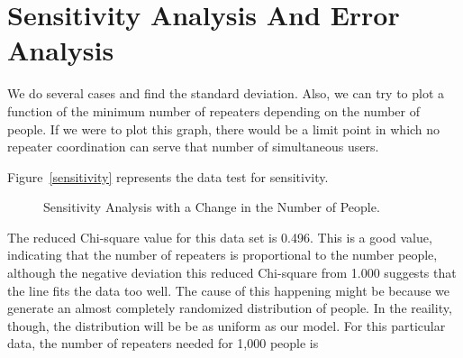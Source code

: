 \documentclass{icmmcm}
\begin{document}
\section{Sensitivity Analysis And Error Analysis}
We do several cases and find the standard deviation. Also, we can try to plot a function of the minimum number of repeaters depending on the number of people. If we were to plot this graph, there would be a limit point in which no repeater coordination can serve that number of simultaneous users.

Figure~\ref{sensitivity} represents the data test for sensitivity.
\begin{figure}[ht]
\begin{center}
\end{center}
\caption[Sensitivity of the Model]{Sensitivity Analysis with a Change in the Number of People.\label{sensitivity}}%
\label{fig:sensitivity}
\end{figure}
The reduced Chi-square value for this data set is 0.496. This is a good value, indicating that the number of repeaters is proportional to the number people, although the negative deviation this reduced Chi-square from 1.000 suggests that the line fits the data too well. The cause of this happening might be because we generate an almost completely randomized distribution of people. In the reaility, though, the distribution will be be as uniform as our model. For this particular data, the number of repeaters needed for 1,000 people is 
\end{document}
